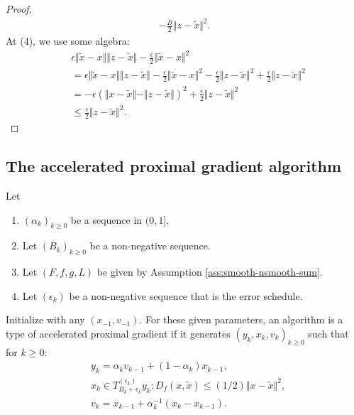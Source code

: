 \documentclass[12pt]{article}
\begin{document}
\begin{proof}
\begin{align*}
            - \frac{B}{2}\Vert z - \tilde x\Vert^2. 
        \end{align*}
        At (4), we use some algebra: 
        \begin{align*}
            &
            \epsilon \Vert \tilde x - x\Vert \Vert z - \tilde x\Vert
            - \frac{\epsilon}{2}\Vert \tilde x - x\Vert^2
            \\
            &=\epsilon \Vert \tilde x - x\Vert \Vert z - \tilde x\Vert
            - \frac{\epsilon}{2}\Vert \tilde x - x\Vert^2 - \frac{\epsilon}{2}\Vert z - \tilde x\Vert^2
            + \frac{\epsilon}{2}\Vert z - \tilde x\Vert^2
            \\
            &= 
            - \epsilon(\Vert x - \tilde x\Vert - \Vert z -\tilde x\Vert)^2 
            + \frac{\epsilon}{2}\Vert z - \tilde x\Vert^2 
            \\
            &\le \frac{\epsilon}{2}\Vert z - \tilde x\Vert^2. 
        \end{align*}
    \end{proof}
    \subsection{The accelerated proximal gradient algorithm}
        \begin{definition}\label{def:inxt-apg}
            Let 
            \begin{enumerate}[nosep]
                \item $(\alpha_k)_{k \ge 0}$ be a sequence in $(0, 1]$. 
                \item Let $(B_k)_{k \ge 0}$ be a non-negative sequence. 
                \item Let $(F, f, g, L)$ be given by Assumption \ref{ass:smooth-nsmooth-sum}. 
                \item Let $(\epsilon_k)$ be a non-negative sequence that is the error schedule. 
            \end{enumerate}
            Initialize with any $(x_{-1}, v_{-1})$. 
            For these given parameters, an algorithm is a type of accelerated proximal gradient if it generates $(y_k, x_k, v_k)_{k \ge 0}$ such that
            for $k\ge 0$: 
            \begin{align*}
                & y_{k} = \alpha_{k} v_{k - 1} + (1 - \alpha_{k}) x_{k - 1},
                \\
                & x_k \in T_{B_k + \epsilon_k}^{(\epsilon_k)}y_k: D_f(x, \tilde x) \le (1/2)\Vert x - \tilde x\Vert^2, 
                \\
                & v_k = x_{k - 1} + \alpha_k^{-1}(x_k - x_{k - 1}).
            \end{align*}
        \end{definition}
\end{document}
